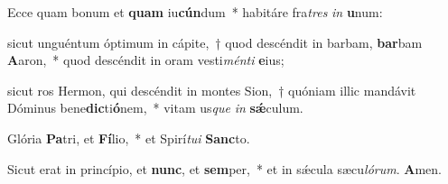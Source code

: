 \item Ecce quam bonum et \textbf{quam} iu\textbf{cún}dum~* habitáre fra\textit{tres} \textit{in} \textbf{u}num:

\item sicut unguéntum óptimum in cápite,~† quod descéndit in barbam, \textbf{bar}bam \textbf{A}aron,~* quod descéndit in oram vesti\textit{ménti} \textbf{e}ius;

\item sicut ros Hermon, qui descéndit in montes Sion,~† quóniam illic mandávit Dóminus bene\textbf{dic}ti\textbf{ó}nem,~* vitam us\textit{que} \textit{in} \textbf{sǽ}culum.

\item Glória \textbf{Pa}tri, et \textbf{Fí}lio,~* et Spirí\textit{tui} \textbf{Sanc}to.

\item Sicut erat in princípio, et \textbf{nunc}, et \textbf{sem}per,~* et in sǽcula sæcu\textit{lórum}. \textbf{A}men.